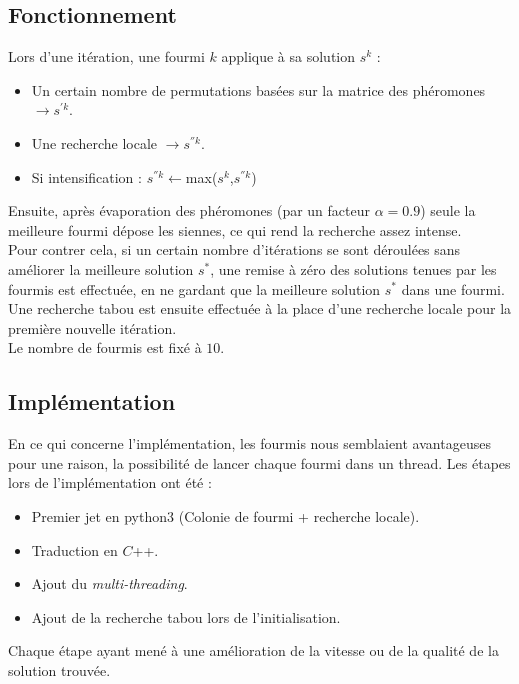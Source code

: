\documentclass[b]{beamer}
\begin{document}
\subsection{Fonctionnement}
\begin{frame}
Lors d'une itération, une fourmi $k$ applique à sa solution $s^k$ :
\begin{itemize}
	\item Un certain nombre de permutations basées sur la matrice des phéromones $\rightarrow s^{'k}$.
	\item Une recherche locale $\rightarrow s^{''k}$.
	\item Si intensification : $s^{''k}\leftarrow$max($s^k$,$s^{''k}$)
\end{itemize}
Ensuite, après évaporation des phéromones (par un facteur $\alpha=0.9$) seule la meilleure fourmi dépose les siennes, ce qui rend la recherche assez intense.\\
Pour contrer cela, si un certain nombre d'itérations se sont déroulées sans améliorer la meilleure solution $s^*$, une remise à zéro des solutions tenues par les fourmis est effectuée, en ne gardant que la meilleure solution $s^*$ dans une fourmi. Une recherche tabou est ensuite effectuée à la place d'une recherche locale pour la première nouvelle itération.\\[.5cm]
Le nombre de fourmis est fixé à $10$.
\end{frame}

\subsection{Implémentation}
\begin{frame}
En ce qui concerne l'implémentation, les fourmis nous semblaient avantageuses pour une raison, la possibilité de lancer chaque fourmi dans un thread. Les étapes lors de l'implémentation ont été :
\begin{itemize}
	\item Premier jet en python3 (Colonie de fourmi + recherche locale).
	\item Traduction en $C$++.
	\item Ajout du \emph{multi-threading}.
	\item Ajout de la recherche tabou lors de l'initialisation.
\end{itemize}
Chaque étape ayant mené à une amélioration de la vitesse ou de la qualité de la solution trouvée.
\end{frame}
\end{document}
